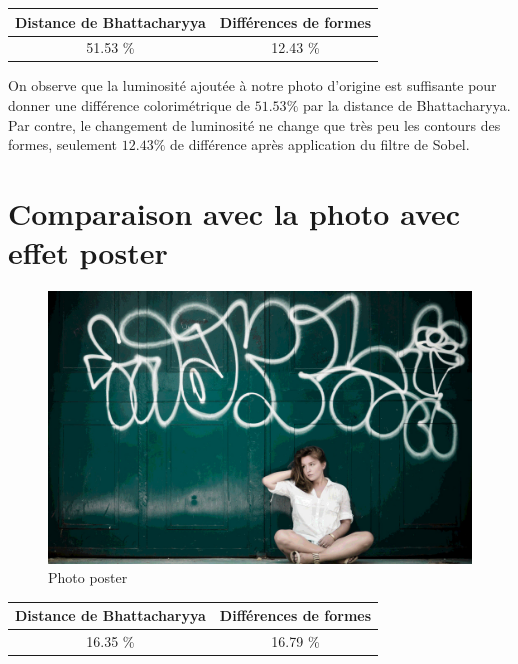 \documentclass[]{article}
\begin{document}
\begin{center}
\begin{tabular}{|c|c|}
  \hline
  Distance de Bhattacharyya & Différences de formes \\
  \hline
  51.53 \% & 12.43 \% \\
  \hline
\end{tabular}
\end{center}


On observe que la luminosité ajoutée à notre photo d'origine est
suffisante pour donner une différence colorimétrique de $51.53 \%$ par la
distance de Bhattacharyya. Par contre, le changement de luminosité ne
change que très peu les contours des formes, seulement $12.43 \%$ de
différence après application du filtre de Sobel.

\newpage

\section{Comparaison avec la photo avec effet
poster}\label{comparaison-avec-la-photo-avec-effet-poster}

\begin{figure}[htbp]
\centering
\includegraphics{photos/poster.jpg}
\caption{Photo poster}
\end{figure}

\begin{center}
\begin{tabular}{|c|c|}
  \hline
  Distance de Bhattacharyya & Différences de formes \\
  \hline
  16.35 \% & 16.79 \% \\
  \hline
\end{tabular}
\end{center}
\end{document}
